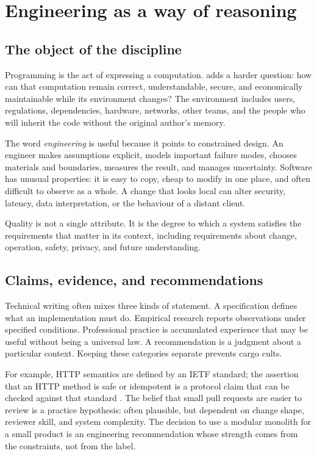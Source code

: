 \chapter{Engineering as a way of reasoning}

\section{The object of the discipline}
Programming is the act of expressing a computation. 
adds a harder question: how can that computation remain correct, understandable,
secure, and economically maintainable while its environment changes? The
environment includes users, regulations, dependencies, hardware, networks,
other teams, and the people who will inherit the code without the original
author's memory.

The word \emph{engineering} is useful because it points to constrained design.
An engineer makes assumptions explicit, models important failure modes, chooses
materials and boundaries, measures the result, and manages uncertainty. Software
has unusual properties: it is easy to copy, cheap to modify in one place, and
often difficult to observe as a whole. A change that looks local can alter
security, latency, data interpretation, or the behaviour of a distant client.

\begin{keyidea}
Quality is not a single attribute. It is the degree to which a system satisfies
the requirements that matter in its context, including requirements about
change, operation, safety, privacy, and future understanding.
\end{keyidea}

\section{Claims, evidence, and recommendations}
Technical writing often mixes three kinds of statement. A specification defines
what an implementation must do. Empirical research reports observations under
specified conditions. Professional practice is accumulated experience that may
be useful without being a universal law. A recommendation is a judgment about a
particular context. Keeping these categories separate prevents cargo cults.

For example, HTTP semantics are defined by an IETF standard; the assertion that
an HTTP method is safe or idempotent is a protocol claim that can be checked
against that standard \cite{ietf2022http}. The belief that small pull requests
are easier to review is a practice hypothesis: often plausible, but dependent
on change shape, reviewer skill, and system complexity. The decision to use a
modular monolith for a small product is an engineering recommendation whose
strength comes from the constraints, not from the label.

